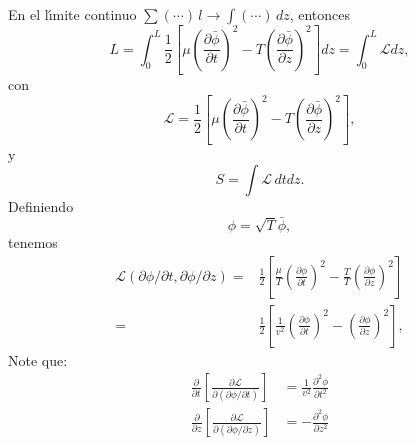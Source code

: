 En el l\'\i mite continuo $\sum(\cdots)\,l\to\int(\cdots)\,dz$, entonces 
\begin{equation}
\label{eq:238}
  L=\int_0^L\frac{1}{2}
\left[
  \mu\left(\frac{\partial\bar\phi}{\partial t}\right)^2- T\left(\frac{\partial\bar\phi}{\partial z}\right)^2
\right]dz=\int_0^L\mathcal{L}dz,
\end{equation}
con
\begin{equation}
  \label{eq:call1}
  \mathcal{L}=\frac{1}{2}
\left[
  \mu\left(\frac{\partial\bar\phi}{\partial t}\right)^2- T\left(\frac{\partial\bar\phi}{\partial z}\right)^2
\right],
\end{equation}
y
\begin{equation}
  \label{eq:Scall}
  S=\int\mathcal{L}\,dtdz.
\end{equation}
Definiendo
\begin{equation}
  \label{eq:barff}
  \phi=\sqrt{T}\bar\phi,
\end{equation}
tenemos
\begin{align}
  \label{eq:call2}
  \mathcal{L}(\partial\phi/\partial t,\partial\phi/\partial z)=&
\frac{1}{2}
\left[
  \frac{\mu}{T}\left(\frac{\partial\phi}{\partial t}\right)^2- \frac{T}{T}\left(\frac{\partial\phi}{\partial z}\right)^2
\right]\nonumber\\
=&\frac{1}{2}
\left[
  \frac{1}{v^2}\left(\frac{\partial\phi}{\partial t}\right)^2-\left(\frac{\partial\phi}{\partial z}\right)^2
\right],
\end{align}
Note que:
\begin{align}
  \label{eq:dcalt}
  \frac{\partial}{\partial t}
  \left[
    \frac{\partial\mathcal{L}}{\partial
      (\partial\phi/\partial t)}
  \right]&=    \frac{1}{v^2}\frac{\partial^2\phi}{\partial t^2}\\
  \label{eq:dcalz} %
  \frac{\partial}{\partial z}
  \left[
    \frac{\partial\mathcal{L}}{\partial
      (\partial\phi/\partial z)}
  \right]&= -\frac{\partial^2\phi}{\partial z^2}
\end{align}



